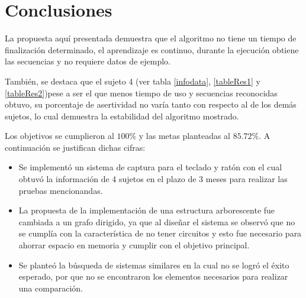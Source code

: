 \section{Conclusiones}
La propuesta aqu\'{i} presentada demuestra que el algoritmo no tiene
 un tiempo de finalizaci\'on determinado, el aprendizaje es continuo, durante 
 la ejecuci\'on obtiene las secuencias y no requiere datos de ejemplo.
 
Tambi\'en, se destaca que el sujeto 4 (ver tabla \ref{infodata},
 \ref{tableRes1} y \ref{tableRes2})pese a ser el que menos tiempo de uso y 
 secuencias reconocidas obtuvo, su porcentaje de asertividad no var\'ia tanto
 con respecto al de los dem\'as sujetos, lo cual demuestra la estabilidad del 
 algoritmo mostrado. 
 
Los objetivos se cumplieron al $100\%$ y las metas planteadas al $85.72\%$. A 
 continuaci\'on se justifican dichas cifras:

\begin{itemize}
\item {
Se implement\'o un sistema de captura para el teclado y rat\'on con el cual 
 obtuv\'o la informaci\'on de 4 sujetos en el plazo de 3 meses para 
 realizar las pruebas mencionandas.
}
	
\item {
La propuesta de la implementaci\'on de una estructura arborescente fue cambiada
 a un grafo dirigido, ya que al dise\~nar el sistema se observ\'o que no se 
 cumpl\'ia con la caracter\'istica de no tener circuitos y esto fue necesario
 para ahorrar espacio en memoria y cumplir con el objetivo principal.
}

\item {
Se plante\'o la b\'usqueda de sistemas similares en la cual no se logr\'o 
 el \'exito esperado, por que no se encontraron los elementos necesarios 
 para realizar una comparaci\'on.
}
\end{itemize}

